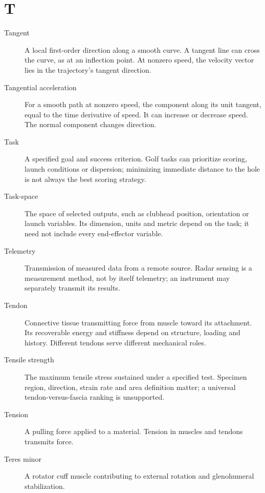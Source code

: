 \section*{T}
\begin{description}

\item[Tangent] A local first-order direction along a smooth curve. A tangent line can cross the curve, as at an inflection point. At nonzero speed, the velocity vector lies in the trajectory's tangent direction.

\item[Tangential acceleration] For a smooth path at nonzero speed, the component along its unit tangent, equal to the time derivative of speed. It can increase or decrease speed. The normal component changes direction.

\item[Task] A specified goal and success criterion. Golf tasks can prioritize scoring, launch conditions or dispersion; minimizing immediate distance to the hole is not always the best scoring strategy.

\item[Task-space] The space of selected outputs, such as clubhead position, orientation or launch variables. Its dimension, units and metric depend on the task; it need not include every end-effector variable.

\item[Telemetry] Transmission of measured data from a remote source. Radar sensing is a measurement method, not by itself telemetry; an instrument may separately transmit its results.

\item[Tendon] Connective tissue transmitting force from muscle toward its attachment. Its recoverable energy and stiffness depend on structure, loading and history. Different tendons serve different mechanical roles.

\item[Tensile strength] The maximum tensile stress sustained under a specified test. Specimen region, direction, strain rate and area definition matter; a universal tendon-versus-fascia ranking is unsupported.

\item[Tension] A pulling force applied to a material. Tension in muscles and tendons transmits force.

\item[Teres minor] A rotator cuff muscle contributing to external rotation and glenohumeral stabilization.


\end{description}
